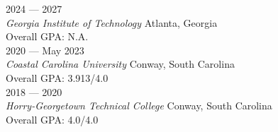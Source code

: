 	\hfill 2024 --- 2027 \\
\textit{Georgia Institute of Technology}    \hfill Atlanta, Georgia \\ 
Overall GPA: N.A. \\
	\hfill 2020 --- May 2023 \\
\textit{Coastal Carolina University}    \hfill Conway, South Carolina \\ 
Overall GPA: 3.913/4.0 \\
   \hfill	2018 --- 2020 \\ 
\textit{Horry-Georgetown Technical College} \hfill Conway, South Carolina \\ 
Overall GPA: 4.0/4.0 \\

